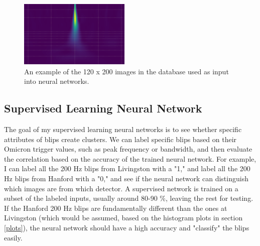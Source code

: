 \documentclass[a4paper]{article}
\begin{document}
\begin{figure}[h!]
	\centering
	\includegraphics[width=.4\linewidth]{image}
	\caption{An example of the 120 x 200 images in the database used as input into neural networks.}
	\label{fig:image}
\end{figure}

\subsection{Supervised Learning Neural Network} \label{section:sup}

The goal of my supervised learning neural networks is to see whether specific attributes of blips create clusters. We can label specific blips based on their Omicron trigger values, such as peak frequency or bandwidth, and then evaluate the correlation based on the accuracy of the trained neural network. For example, I can label all the 200 Hz blips from Livingston with a "1," and label all the 200 Hz blips from Hanford with a "0," and see if the neural network can distinguish which images are from which detector. A supervised network is trained on a subset of the labeled inputs, usually around 80-90 \%, leaving the rest for testing. If the Hanford 200 Hz blips are fundamentally different than the ones at Livingston (which would be assumed, based on the histogram plots in section \ref{plots}), the neural network should have a high accuracy and "classify" the blips easily.
\end{document}

